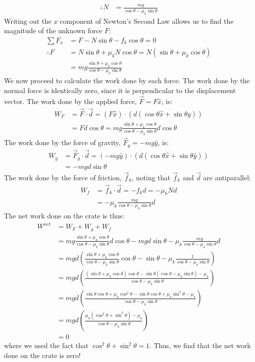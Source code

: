 \begin{example}
\begin{align*}
\therefore N &= \frac{mg}{\cos\theta-\mu_k\sin\theta}
\end{align*}
Writing out the $x$ component of Newton's Second Law allows us to find the magnitude of the unknown force $F$:
\begin{align*}
\sum F_x &= F - N\sin\theta - f_k\cos\theta = 0\\
\therefore F &= N\sin\theta+\mu_kN\cos\theta = N(\sin\theta+\mu_k\cos\theta)\\
&=mg\frac{\sin\theta+\mu_k\cos\theta}{\cos\theta-\mu_k\sin\theta}
\end{align*}
We now proceed to calculate the work done by each force. The work done by the normal force is identically zero, since it is perpendicular to the displacement vector. The work done by the applied force, $\vec F = F\hat x$, is:
\begin{align*}
W_F &= \vec F \cdot \vec d = (F\hat x)\cdot(d (\cos\theta \hat x + \sin\theta \hat y))\\
&=Fd\cos\theta=mg\frac{\sin\theta+\mu_k\cos\theta}{\cos\theta-\mu_k\sin\theta}d\cos\theta
\end{align*}
The work done by the force of gravity, $\vec F_g = -mg \hat y$, is:
\begin{align*}
W_g &= \vec F_g \cdot \vec d = (-mg \hat y)\cdot(d (\cos\theta \hat x + \sin\theta \hat y))\\
&=-mgd\sin\theta
\end{align*}
The work done by the force of friction, $\vec f_k$, noting that $\vec f_k$ and $\vec d$ are antiparallel:
\begin{align*}
W_f &= \vec f_k \cdot \vec d = -f_kd = -\mu_kNd\\
&=-\mu_k\frac{mg}{\cos\theta-\mu_k\sin\theta}d
\end{align*}
The net work done on the crate is thus:
\begin{align*}
W^{net}&=W_F + W_g + W_f\\
&=mg\frac{\sin\theta+\mu_k\cos\theta}{\cos\theta-\mu_k\sin\theta}d\cos\theta-mgd\sin\theta -\mu_k\frac{mg}{\cos\theta-\mu_k\sin\theta}d\\
&=mgd \left(  \frac{\sin\theta+\mu_k\cos\theta}{\cos\theta-\mu_k\sin\theta}\cos\theta - \sin\theta - \mu_k\frac{1}{\cos\theta-\mu_k\sin\theta} \right)\\
&=mgd \left(  \frac{(\sin\theta+\mu_k\cos\theta)\cos\theta - \sin\theta(\cos\theta-\mu_k\sin\theta) - \mu_k}{\cos\theta-\mu_k\sin\theta} \right)\\
&=mgd \left(  \frac{\sin\theta\cos\theta+\mu_k\cos^2\theta - \sin\theta\cos\theta+\mu_k\sin^2\theta - \mu_k}{\cos\theta-\mu_k\sin\theta} \right)\\
&=mgd \left(  \frac{\mu_k(\cos^2\theta+\sin^2\theta) - \mu_k}{\cos\theta-\mu_k\sin\theta} \right)\\
&=0
\end{align*}
where we used the fact that $\cos^2\theta+\sin^2\theta=1$. Thus, we find that the net work done on the crate is zero!


\end{example}
